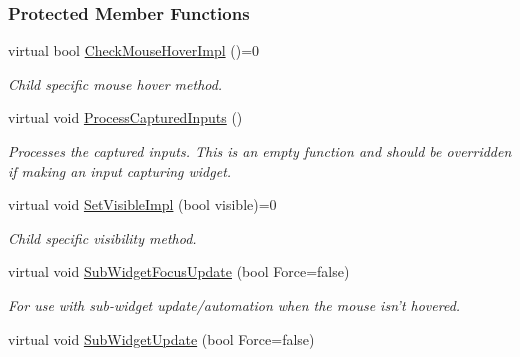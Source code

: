 \subsubsection*{Protected Member Functions}
\begin{DoxyCompactItemize}
\item 
\hypertarget{classMezzanine_1_1UI_1_1Widget_adb2f2020d4a3bfef6c76e5ac0fdf26cb}{
virtual bool \hyperlink{classMezzanine_1_1UI_1_1Widget_adb2f2020d4a3bfef6c76e5ac0fdf26cb}{CheckMouseHoverImpl} ()=0}
\label{classMezzanine_1_1UI_1_1Widget_adb2f2020d4a3bfef6c76e5ac0fdf26cb}

\begin{DoxyCompactList}\small\item\em Child specific mouse hover method. \item\end{DoxyCompactList}\item 
\hypertarget{classMezzanine_1_1UI_1_1Widget_ab4aadd7cef4beda4f13b4c4918209a5f}{
virtual void \hyperlink{classMezzanine_1_1UI_1_1Widget_ab4aadd7cef4beda4f13b4c4918209a5f}{ProcessCapturedInputs} ()}
\label{classMezzanine_1_1UI_1_1Widget_ab4aadd7cef4beda4f13b4c4918209a5f}

\begin{DoxyCompactList}\small\item\em Processes the captured inputs. This is an empty function and should be overridden if making an input capturing widget. \item\end{DoxyCompactList}\item 
\hypertarget{classMezzanine_1_1UI_1_1Widget_a766e29f02a4d6640812462e4a8bdb272}{
virtual void \hyperlink{classMezzanine_1_1UI_1_1Widget_a766e29f02a4d6640812462e4a8bdb272}{SetVisibleImpl} (bool visible)=0}
\label{classMezzanine_1_1UI_1_1Widget_a766e29f02a4d6640812462e4a8bdb272}

\begin{DoxyCompactList}\small\item\em Child specific visibility method. \item\end{DoxyCompactList}\item 
\hypertarget{classMezzanine_1_1UI_1_1Widget_afc1b4bcc448e9ecf977a987c9b348547}{
virtual void \hyperlink{classMezzanine_1_1UI_1_1Widget_afc1b4bcc448e9ecf977a987c9b348547}{SubWidgetFocusUpdate} (bool Force=false)}
\label{classMezzanine_1_1UI_1_1Widget_afc1b4bcc448e9ecf977a987c9b348547}

\begin{DoxyCompactList}\small\item\em For use with sub-\/widget update/automation when the mouse isn't hovered. \item\end{DoxyCompactList}\item 
\hypertarget{classMezzanine_1_1UI_1_1Widget_a3fb336cd36759be294dfb845be810d0a}{
virtual void \hyperlink{classMezzanine_1_1UI_1_1Widget_a3fb336cd36759be294dfb845be810d0a}{SubWidgetUpdate} (bool Force=false)}
\label{classMezzanine_1_1UI_1_1Widget_a3fb336cd36759be294dfb845be810d0a}


\end{DoxyCompactItemize}

